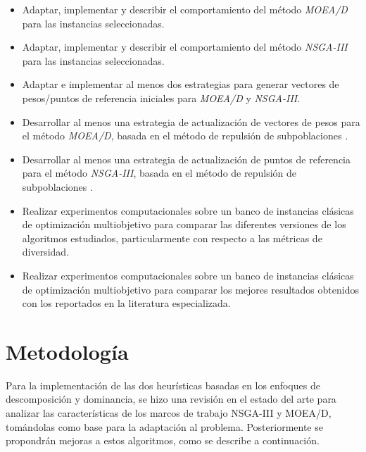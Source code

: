 \documentclass[letterpaper,10pt]{article}
\begin{document}
\begin{itemize}

\item Adaptar, implementar y describir el comportamiento del método \emph{MOEA/D} para las instancias seleccionadas.
 
\item Adaptar, implementar y describir el comportamiento del método \emph{NSGA-III} para las instancias seleccionadas.

\item Adaptar e implementar al menos dos estrategias para generar vectores de pesos/puntos de referencia iniciales para \emph{MOEA/D} y \emph{NSGA-III}.

\item Desarrollar al menos una estrategia de actualización de vectores de pesos para el método \emph{MOEA/D}, basada en el método de repulsión de subpoblaciones \cite{ahrari2016multimodal}.

\item Desarrollar al menos una estrategia de actualización de puntos de referencia para el método \emph{NSGA-III}, basada en el método de repulsión de subpoblaciones \cite{ahrari2016multimodal}.
  
\item Realizar experimentos computacionales sobre un banco de instancias clásicas de optimización multiobjetivo \cite{zhang2008multiobjective} para comparar las diferentes versiones de los algoritmos estudiados, particularmente con respecto a las métricas de diversidad.

\item Realizar experimentos computacionales sobre un banco de instancias clásicas de optimización multiobjetivo \cite{zhang2008multiobjective} para comparar los mejores resultados obtenidos con los reportados en la literatura especializada.  

\end{itemize}


\section{Metodología}

Para la implementación de las dos heurísticas basadas en los enfoques de descomposición y dominancia, se hizo una revisión en el estado del arte para analizar las características de los marcos de trabajo NSGA-III y MOEA/D, tomándolas  como  base para la adaptación al problema. Posteriormente se propondrán mejoras a estos algoritmos, como se describe a continuación.
\newline
\end{document}
